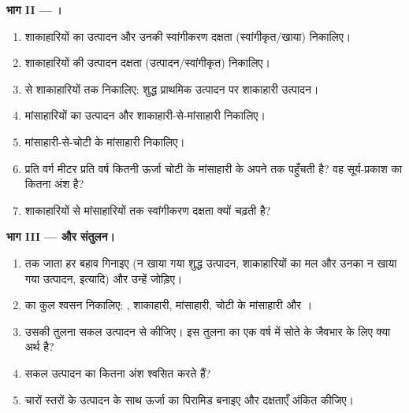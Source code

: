 \begin{problem}
\medskip
\noindent\textbf{भाग II --- ।}
\begin{enumerate}[resume]
  \item शाकाहारियों का उत्पादन और उनकी स्वांगीकरण दक्षता
        (स्वांगीकृत/खाया) निकालिए।
  \item शाकाहारियों की उत्पादन दक्षता
        (उत्पादन/स्वांगीकृत) निकालिए।
  \item {} से शाकाहारियों तक  निकालिए: शुद्ध
        प्राथमिक उत्पादन पर शाकाहारी उत्पादन।
  \item मांसाहारियों का उत्पादन और शाकाहारी-से-मांसाहारी 
        निकालिए।
  \item मांसाहारी-से-चोटी के मांसाहारी  निकालिए।
  \item प्रति वर्ग मीटर प्रति वर्ष कितनी ऊर्जा चोटी के मांसाहारी के
        अपने  तक पहुँचती है? वह सूर्य-प्रकाश का कितना अंश
        है?
  \item शाकाहारियों से मांसाहारियों तक स्वांगीकरण दक्षता क्यों चढ़ती
        है?
\end{enumerate}

\medskip
\noindent\textbf{भाग III ---  और संतुलन।}
\begin{enumerate}[resume]
  \item {} तक जाता हर बहाव गिनाइए (न खाया गया शुद्ध उत्पादन,
        शाकाहारियों का मल और उनका न खाया गया उत्पादन, इत्यादि) और
        उन्हें जोड़िए।
  \item {} का कुल श्वसन निकालिए: , शाकाहारी, मांसाहारी,
        चोटी के मांसाहारी और ।
  \item उसकी तुलना सकल उत्पादन से कीजिए। इस तुलना का एक वर्ष में सोते
        के जैवभार के लिए क्या अर्थ है?
  \item सकल उत्पादन का कितना अंश  श्वसित करते हैं?
  \item चारों स्तरों के उत्पादन के साथ ऊर्जा का पिरामिड बनाइए और
        दक्षताएँ अंकित कीजिए।
\end{enumerate}


\end{problem}
